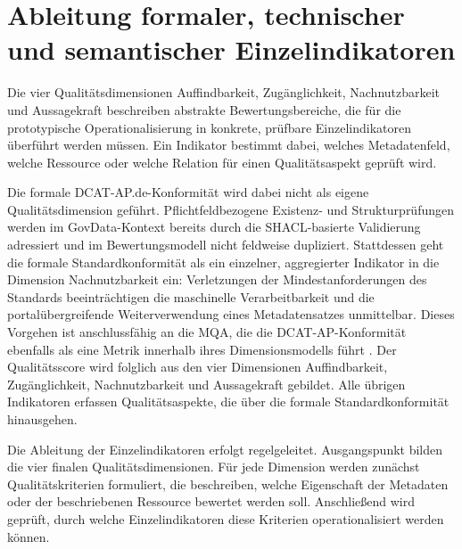 

\section{Ableitung formaler, technischer und semantischer Einzelindikatoren}

Die vier Qualitätsdimensionen Auffindbarkeit, Zugänglichkeit, Nachnutzbarkeit und Aussagekraft beschreiben abstrakte Bewertungsbereiche, die für die prototypische Operationalisierung in konkrete, prüfbare Einzelindikatoren überführt werden müssen. Ein Indikator bestimmt dabei, welches Metadatenfeld, welche Ressource oder welche Relation für einen Qualitätsaspekt geprüft wird.

Die formale DCAT-AP.de-Konformität wird dabei nicht als eigene Qualitätsdimension geführt. Pflichtfeldbezogene Existenz- und Strukturprüfungen werden im GovData-Kontext bereits durch die SHACL-basierte Validierung adressiert und im Bewertungsmodell nicht feldweise dupliziert. Stattdessen geht die formale Standardkonformität als ein einzelner, aggregierter Indikator in die Dimension Nachnutzbarkeit ein: Verletzungen der Mindestanforderungen des Standards beeinträchtigen die maschinelle Verarbeitbarkeit und die portalübergreifende Weiterverwendung eines Metadatensatzes unmittelbar. Dieses Vorgehen ist anschlussfähig an die MQA, die die DCAT-AP-Konformität ebenfalls als eine Metrik innerhalb ihres Dimensionsmodells führt \cite{data_europa, wentzel2023extensive}. Der Qualitätsscore wird folglich aus den vier Dimensionen Auffindbarkeit, Zugänglichkeit, Nachnutzbarkeit und Aussagekraft gebildet. Alle übrigen Indikatoren erfassen Qualitätsaspekte, die über die formale Standardkonformität hinausgehen.

Die Ableitung der Einzelindikatoren erfolgt regelgeleitet. Ausgangspunkt bilden die vier finalen Qualitätsdimensionen. Für jede Dimension werden zunächst Qualitätskriterien formuliert, die beschreiben, welche Eigenschaft der Metadaten oder der beschriebenen Ressource bewertet werden soll. Anschließend wird geprüft, durch welche Einzelindikatoren diese Kriterien operationalisiert werden können.

